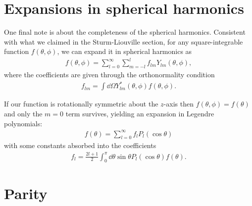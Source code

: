\section{Expansions in spherical harmonics}

One final note is about the completeness of the spherical harmonics.
Consistent with what we claimed in the Sturm-Liouville section, for any square-integrable function $f(\theta,\phi)$, we can expand it in spherical harmonics as
\begin{eqnarray}
    f(\theta,\phi) = \sum_{l=0}^{\infty} \sum_{m=-l}^{l} f_{lm} Y_{lm}(\theta,\phi)
,\end{eqnarray}
where the coefficients are given through the orthonormality condition
\begin{eqnarray}
    f_{lm} = \int \dd{\Omega} Y_{lm}^{*}(\theta,\phi) f(\theta,\phi)
.\end{eqnarray}

If our function is rotationally symmetric about the $z$-axis then $f(\theta,\phi) = f(\theta)$ and only the $m = 0$ term survives, yielding an expansion in Legendre polynomials:
\begin{eqnarray}
    f(\theta) = \sum_{l=0}^{\infty} f_{l} P_{l}(\cos{\theta})
\end{eqnarray}
with some constants absorbed into the coefficients
\begin{eqnarray}
    f_{l} = \frac{2l+1}{2} \int_{0}^{\pi} \dd{\theta} \sin{\theta} P_{l}(\cos{\theta}) f(\theta)
.\end{eqnarray}


\section{Parity}

